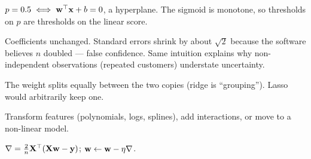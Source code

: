 \A $p=0.5\iff\mathbf{w}^\top\mathbf{x}+b=0$, a hyperplane. The sigmoid is monotone, so thresholds on $p$ are thresholds on the linear score.

\A Coefficients unchanged. Standard errors shrink by about $\sqrt2$ because the software believes $n$ doubled --- false confidence. Same intuition explains why non-independent observations (repeated customers) understate uncertainty.

\A The weight splits equally between the two copies (ridge is ``grouping''). Lasso would arbitrarily keep one.

\A Transform features (polynomials, logs, splines), add interactions, or move to a non-linear model.

\A $\nabla=\frac2n\mathbf{X}^\top(\mathbf{X}\mathbf{w}-\mathbf{y})$; $\mathbf{w}\leftarrow\mathbf{w}-\eta\nabla$.
